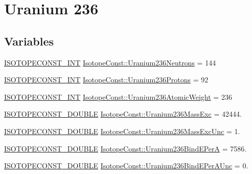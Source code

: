 \hypertarget{group___isotope_const-_uranium-_u236}{}\section{Uranium 236}
\label{group___isotope_const-_uranium-_u236}
\subsection*{Variables}
\begin{DoxyCompactItemize}
\item 
\mbox{\hyperlink{group___isotope_const-_macros_ga5f18360b3e99483a35c32d789e62621c}{I\+S\+O\+T\+O\+P\+E\+C\+O\+N\+S\+T\+\_\+\+I\+NT}} \mbox{\hyperlink{group___isotope_const-_uranium-_u236_ga34f02dee244b9f146d4f7f47e228157f}{Isotope\+Const\+::\+Uranium236\+Neutrons}} = 144
\item 
\mbox{\hyperlink{group___isotope_const-_macros_ga5f18360b3e99483a35c32d789e62621c}{I\+S\+O\+T\+O\+P\+E\+C\+O\+N\+S\+T\+\_\+\+I\+NT}} \mbox{\hyperlink{group___isotope_const-_uranium-_u236_ga0eeb5f96a11e1b805b573423b3c13ffb}{Isotope\+Const\+::\+Uranium236\+Protons}} = 92
\item 
\mbox{\hyperlink{group___isotope_const-_macros_ga5f18360b3e99483a35c32d789e62621c}{I\+S\+O\+T\+O\+P\+E\+C\+O\+N\+S\+T\+\_\+\+I\+NT}} \mbox{\hyperlink{group___isotope_const-_uranium-_u236_ga2237ec5ecb9e1e91b9c9d52d532a367a}{Isotope\+Const\+::\+Uranium236\+Atomic\+Weight}} = 236
\item 
\mbox{\hyperlink{group___isotope_const-_macros_ga8f45a7272ce02c0b4c65c44636ed719a}{I\+S\+O\+T\+O\+P\+E\+C\+O\+N\+S\+T\+\_\+\+D\+O\+U\+B\+LE}} \mbox{\hyperlink{group___isotope_const-_uranium-_u236_ga43498a1437d59bfd0020f2a3fa8275b5}{Isotope\+Const\+::\+Uranium236\+Mass\+Exc}} = 42444.
\item 
\mbox{\hyperlink{group___isotope_const-_macros_ga8f45a7272ce02c0b4c65c44636ed719a}{I\+S\+O\+T\+O\+P\+E\+C\+O\+N\+S\+T\+\_\+\+D\+O\+U\+B\+LE}} \mbox{\hyperlink{group___isotope_const-_uranium-_u236_ga0e02dcbf6e38c68323494dec33d0ff50}{Isotope\+Const\+::\+Uranium236\+Mass\+Exc\+Unc}} = 1.
\item 
\mbox{\hyperlink{group___isotope_const-_macros_ga8f45a7272ce02c0b4c65c44636ed719a}{I\+S\+O\+T\+O\+P\+E\+C\+O\+N\+S\+T\+\_\+\+D\+O\+U\+B\+LE}} \mbox{\hyperlink{group___isotope_const-_uranium-_u236_ga8ae3d7e5de1369a5aad584c0240bd8d6}{Isotope\+Const\+::\+Uranium236\+Bind\+E\+PerA}} = 7586.
\item 
\mbox{\hyperlink{group___isotope_const-_macros_ga8f45a7272ce02c0b4c65c44636ed719a}{I\+S\+O\+T\+O\+P\+E\+C\+O\+N\+S\+T\+\_\+\+D\+O\+U\+B\+LE}} \mbox{\hyperlink{group___isotope_const-_uranium-_u236_gae074d4942842e2cf188b113591b68a7a}{Isotope\+Const\+::\+Uranium236\+Bind\+E\+Per\+A\+Unc}} = 0.

\end{DoxyCompactItemize}
